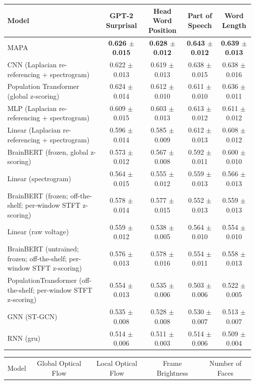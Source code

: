 \begin{table}[!htbp]
\begin{tabular}{>{\raggedright\arraybackslash}p{8cm}cccc}
\hline
Model & GPT-2 Surprisal & Head Word Position & Part of Speech & Word Length \\
\hline
MAPA & \textbf{0.626 $\pm$ 0.015} & \textbf{0.628 $\pm$ 0.012} & \textbf{0.643 $\pm$ 0.012} & \textbf{0.639 $\pm$ 0.013} \\
CNN (Laplacian re-referencing + spectrogram) & 0.622 $\pm$ 0.013 & 0.619 $\pm$ 0.013 & 0.638 $\pm$ 0.015 & 0.638 $\pm$ 0.016 \\
Population Transformer (global z-scoring) & 0.624 $\pm$ 0.014 & 0.612 $\pm$ 0.010 & 0.611 $\pm$ 0.010 & 0.636 $\pm$ 0.011 \\
MLP (Laplacian re-referencing + spectrogram) & 0.609 $\pm$ 0.015 & 0.603 $\pm$ 0.013 & 0.613 $\pm$ 0.012 & 0.611 $\pm$ 0.012 \\
Linear (Laplacian re-referencing + spectrogram) & 0.596 $\pm$ 0.014 & 0.585 $\pm$ 0.009 & 0.612 $\pm$ 0.013 & 0.608 $\pm$ 0.012 \\
BrainBERT (frozen, global z-scoring) & 0.573 $\pm$ 0.012 & 0.567 $\pm$ 0.008 & 0.592 $\pm$ 0.011 & 0.600 $\pm$ 0.010 \\
Linear (spectrogram) & 0.564 $\pm$ 0.015 & 0.555 $\pm$ 0.012 & 0.559 $\pm$ 0.013 & 0.566 $\pm$ 0.013 \\
BrainBERT (frozen; off-the-shelf; per-window STFT z-scoring) & 0.578 $\pm$ 0.014 & 0.577 $\pm$ 0.015 & 0.552 $\pm$ 0.013 & 0.559 $\pm$ 0.013 \\
Linear (raw voltage) & 0.559 $\pm$ 0.012 & 0.538 $\pm$ 0.005 & 0.564 $\pm$ 0.010 & 0.554 $\pm$ 0.010 \\
BrainBERT (untrained; frozen; off-the-shelf; per-window STFT z-scoring) & 0.576 $\pm$ 0.013 & 0.578 $\pm$ 0.016 & 0.554 $\pm$ 0.011 & 0.558 $\pm$ 0.013 \\
PopulationTransformer (off-the-shelf; per-window STFT z-scoring) & 0.554 $\pm$ 0.013 & 0.535 $\pm$ 0.006 & 0.503 $\pm$ 0.006 & 0.522 $\pm$ 0.005 \\
GNN (ST-GCN) & 0.535 $\pm$ 0.008 & 0.528 $\pm$ 0.008 & 0.530 $\pm$ 0.007 & 0.513 $\pm$ 0.007 \\
RNN (gru) & 0.514 $\pm$ 0.006 & 0.511 $\pm$ 0.003 & 0.514 $\pm$ 0.006 & 0.509 $\pm$ 0.004 \\
\hline
\end{tabular}
\hspace{1em}
\hspace*{-2.5cm}\begin{tabular}{>{\raggedright\arraybackslash}p{8cm}cccc}
\hline
Model & Global Optical Flow & Local Optical Flow & Frame Brightness & Number of Faces \\

\end{tabular}
\end{table}
